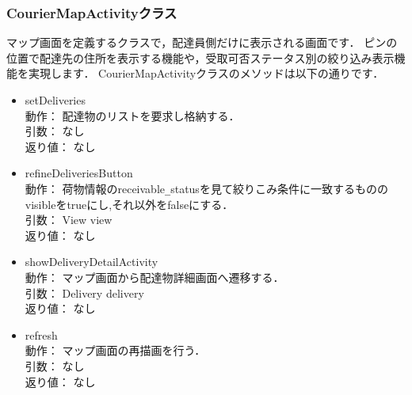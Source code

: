 \documentclass[a4j,titlepage]{jarticle}
\begin{document}
\subsubsection{CourierMapActivityクラス}
マップ画面を定義するクラスで，配達員側だけに表示される画面です．
ピンの位置で配達先の住所を表示する機能や，受取可否ステータス別の絞り込み表示機能を実現します．
CourierMapActivityクラスのメソッドは以下の通りです．
\begin{itemize}
\item setDeliveries\\
動作： 配達物のリストを要求し格納する．\\
引数： なし\\
返り値： なし

\item refineDeliveriesButton\\
動作： 荷物情報のreceivable\verb|_|statusを見て絞りこみ条件に一致するもののvisibleをtrueにし,それ以外をfalseにする．\\
引数： View view\\
返り値： なし

\item showDeliveryDetailActivity\\
動作： マップ画面から配達物詳細画面へ遷移する．\\
引数： Delivery delivery\\
返り値： なし

\item refresh\\
動作： マップ画面の再描画を行う．\\
引数： なし\\
返り値： なし
\end{itemize}
\end{document}
